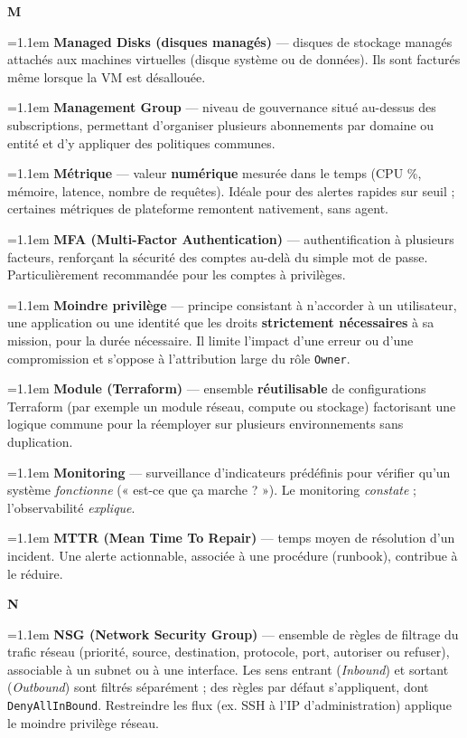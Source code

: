 \documentclass[11pt,a4paper]{article}
\newcommand{\co}[1]{\texttt{\small #1}}
\newcommand{\lettre}[1]{%
  \par\addvspace{9pt}\needspace{4.5\baselineskip}%
  \markright{#1}%
  {\noindent\sffamily\bfseries\Large\color{azure}#1}%
  \nobreak\vspace{0.4mm}{\color{azure!45}\hrule height 1pt}\nobreak\vspace{3mm}\par}
\newcommand{\df}[2]{%
  \par\addvspace{4pt}\needspace{2\baselineskip}%
  \hangindent=1.1em\hangafter=1
  {\sffamily\bfseries\color{azuredark}#1} — #2\par}
\begin{document}
\lettre{M}

\df{Managed Disks (disques managés)}{disques de stockage managés attachés aux machines virtuelles (disque système ou de données). Ils sont facturés même lorsque la VM est désallouée.}

\df{Management Group}{niveau de gouvernance situé au-dessus des subscriptions, permettant d'organiser plusieurs abonnements par domaine ou entité et d'y appliquer des politiques communes.}

\df{Métrique}{valeur \textbf{numérique} mesurée dans le temps (CPU \%, mémoire, latence, nombre de requêtes). Idéale pour des alertes rapides sur seuil ; certaines métriques de plateforme remontent nativement, sans agent.}

\df{MFA (Multi-Factor Authentication)}{authentification à plusieurs facteurs, renforçant la sécurité des comptes au-delà du simple mot de passe. Particulièrement recommandée pour les comptes à privilèges.}

\df{Moindre privilège}{principe consistant à n'accorder à un utilisateur, une application ou une identité que les droits \textbf{strictement nécessaires} à sa mission, pour la durée nécessaire. Il limite l'impact d'une erreur ou d'une compromission et s'oppose à l'attribution large du rôle \co{Owner}.}

\df{Module (Terraform)}{ensemble \textbf{réutilisable} de configurations Terraform (par exemple un module réseau, compute ou stockage) factorisant une logique commune pour la réemployer sur plusieurs environnements sans duplication.}

\df{Monitoring}{surveillance d'indicateurs prédéfinis pour vérifier qu'un système \emph{fonctionne} (« est-ce que ça marche ? »). Le monitoring \emph{constate} ; l'observabilité \emph{explique}.}

\df{MTTR (Mean Time To Repair)}{temps moyen de résolution d'un incident. Une alerte actionnable, associée à une procédure (runbook), contribue à le réduire.}

\lettre{N}

\df{NSG (Network Security Group)}{ensemble de règles de filtrage du trafic réseau (priorité, source, destination, protocole, port, autoriser ou refuser), associable à un subnet ou à une interface. Les sens entrant (\emph{Inbound}) et sortant (\emph{Outbound}) sont filtrés séparément ; des règles par défaut s'appliquent, dont \co{DenyAllInBound}. Restreindre les flux (ex. SSH à l'IP d'administration) applique le moindre privilège réseau.}
\end{document}
